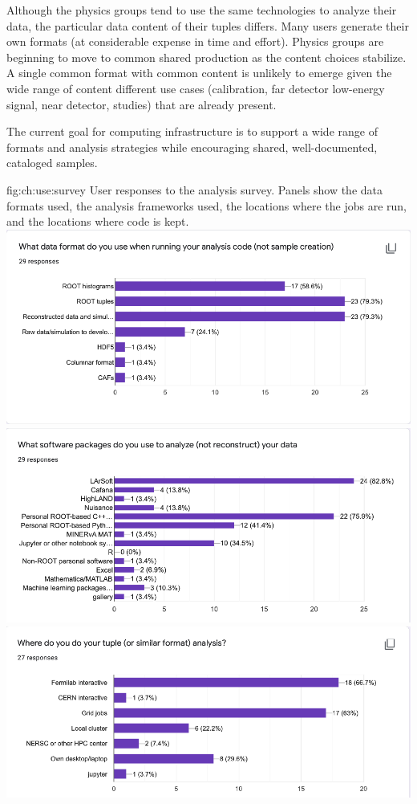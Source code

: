 \documentclass[../main-v1.tex]{subfiles}
\begin{document}
Although the physics groups tend to use the same technologies to analyze their data, the particular data content of their tuples differs.  Many users generate their own formats (at considerable expense in time and effort). Physics groups are beginning to move to common shared production as the content choices stabilize.  A single common format with common content is unlikely to emerge given the wide range of content different use cases (calibration, far detector low-energy signal, near detector,  studies) that are already present.

The current goal for computing infrastructure is to support a wide range of formats and analysis strategies while encouraging shared, well-documented, cataloged samples. 

\begin{dunefigure}
{fig:ch:use:survey}
 {User responses to the analysis survey. Panels show the data formats used, the analysis frameworks used, the locations where the jobs are run, and the locations where code is kept.}
\includegraphics[width=6 in]{graphics/Algo/SurveyFormat.png}
\includegraphics[width=6 in]{graphics/Algo/SurveyCode.png}
\includegraphics[width=6 in]{graphics/Algo/SurveySite.png}

\end{dunefigure}
\end{document}
